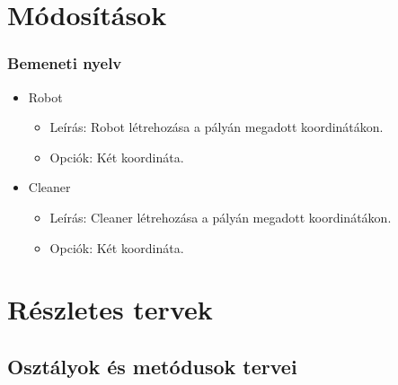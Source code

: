%
\setcounter{chapter}{-1}

\chapter{Módosítások}

\subsection{Bemeneti nyelv}

\begin{itemize}
\item Robot
    \begin{itemize}
	\item Leírás: Robot létrehozása a pályán megadott koordinátákon.
	\item Opciók: Két koordináta.
	\end{itemize}
	
\item Cleaner
    \begin{itemize}
	\item Leírás: Cleaner létrehozása a pályán megadott koordinátákon.
	\item Opciók: Két koordináta.
	\end{itemize}
\end{itemize}

\chapter{Részletes tervek}

\thispagestyle{fancy}

\section{Osztályok és metódusok tervei}


